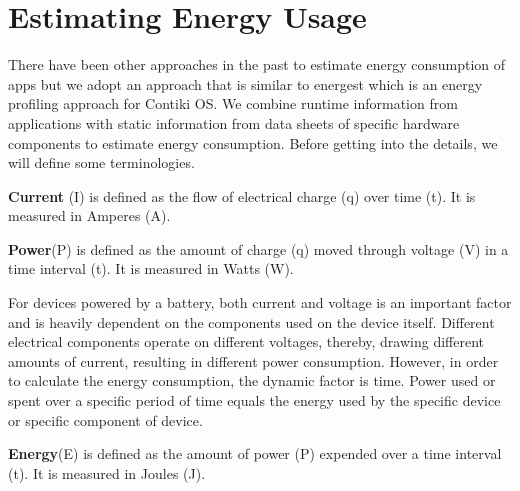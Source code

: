 \section{Estimating Energy Usage}
There have been other approaches in the past to estimate energy consumption of apps \cite{6606555} but we 
adopt an approach that is similar to energest \cite{energest} which is an energy profiling approach for Contiki OS. 
We combine runtime information from applications with static information from data sheets of specific 
hardware components to estimate energy consumption. Before getting into the details, we will define some 
terminologies. \\

\begin{definition}
    \textbf{Current }(I) is defined as the flow of electrical charge (q) over time (t). It is measured in Amperes (A).
\end{definition}

\begin{definition}
    \textbf{Power}(P) is defined as the amount of charge (q) moved through voltage (V) in a time interval (t). It is measured in Watts (W).
\end{definition}

For devices powered by a battery, both current and voltage is an important factor and is heavily dependent 
on the components used on the device itself. Different electrical components operate on different voltages, thereby, 
drawing different amounts of current, resulting in different power consumption. However, in order to calculate the 
energy consumption, the dynamic factor is time. Power used or spent over a specific period of time equals the 
energy used by the specific device or specific component of device. 

\begin{definition}
    \textbf{Energy}(E) is defined as the amount of power (P) expended over a time interval (t). It is measured in Joules (J).
\end{definition}

